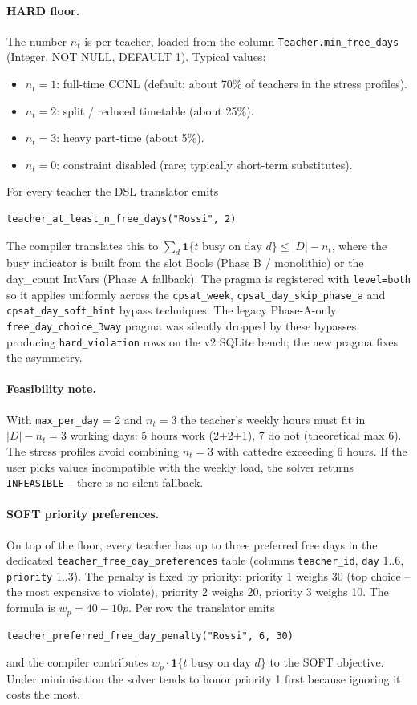 \paragraph{HARD floor.} The number $n_t$ is per-teacher,
loaded from the column \texttt{Teacher.min\_free\_days}
(Integer, NOT NULL, DEFAULT 1). Typical values:
\begin{itemize}
  \item $n_t = 1$: full-time CCNL (default; about 70\% of
    teachers in the stress profiles).
  \item $n_t = 2$: split / reduced timetable (about 25\%).
  \item $n_t = 3$: heavy part-time (about 5\%).
  \item $n_t = 0$: constraint disabled (rare; typically
    short-term substitutes).
\end{itemize}
For every teacher the DSL translator emits
\begin{verbatim}
teacher_at_least_n_free_days("Rossi", 2)
\end{verbatim}
The compiler translates this to
$\sum_d \mathbf{1}\{t\text{ busy on day }d\} \le |D| - n_t$,
where the busy indicator is built from the slot Bools
(Phase B / monolithic) or the day\_count IntVars (Phase A
fallback). The pragma is registered with
\texttt{level=both} so it applies uniformly across the
\texttt{cpsat\_week}, \texttt{cpsat\_day\_skip\_phase\_a}
and \texttt{cpsat\_day\_soft\_hint} bypass techniques.
The legacy Phase-A-only \texttt{free\_day\_choice\_3way}
pragma was silently dropped by these bypasses, producing
\texttt{hard\_violation} rows on the v2 SQLite bench; the
new pragma fixes the asymmetry.

\paragraph{Feasibility note.} With \texttt{max\_per\_day} = 2
and $n_t = 3$ the teacher's weekly hours must fit in
$|D| - n_t = 3$ working days: 5 hours work (2+2+1), 7 do
not (theoretical max 6). The stress profiles avoid
combining $n_t = 3$ with cattedre exceeding 6 hours. If
the user picks values incompatible with the weekly load,
the solver returns \texttt{INFEASIBLE} -- there is no
silent fallback.

\paragraph{SOFT priority preferences.} On top of the
floor, every teacher has up to three preferred free days
in the dedicated \texttt{teacher\_free\_day\_preferences}
table (columns \texttt{teacher\_id}, \texttt{day} 1..6,
\texttt{priority} 1..3). The penalty is fixed by priority:
priority 1 weighs 30 (top choice -- the most expensive to
violate), priority 2 weighs 20, priority 3 weighs 10. The
formula is $w_p = 40 - 10 p$. Per row the translator emits
\begin{verbatim}
teacher_preferred_free_day_penalty("Rossi", 6, 30)
\end{verbatim}
and the compiler contributes $w_p \cdot
\mathbf{1}\{t\text{ busy on day }d\}$ to the SOFT
objective. Under minimisation the solver tends to honor
priority 1 first because ignoring it costs the most.


